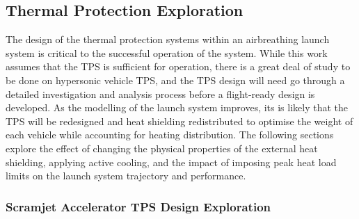 \subsection{Thermal Protection Exploration}

The design of the thermal protection systems within an airbreathing launch system is critical to the successful operation of the system. While this work assumes that the TPS is sufficient for operation, there is a great deal of study to be done on hypersonic vehicle TPS, and the TPS design will need go through a detailed investigation and analysis process before a flight-ready design is developed. 
As the modelling of the launch system improves, its is likely that the TPS will be redesigned and heat shielding redistributed to optimise the weight of each vehicle while accounting for heating distribution. The following sections explore the effect of changing the physical properties of the external heat shielding, applying active cooling, and the impact of imposing peak heat load limits on the launch system trajectory and performance. 

\subsubsection{Scramjet Accelerator TPS Design Exploration}

